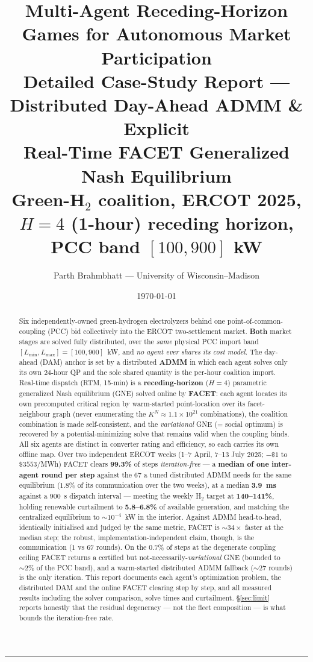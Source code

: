 \documentclass[11pt, letterpaper]{article}
\title{\textbf{Multi-Agent Receding-Horizon Games for Autonomous Market Participation}\\[4pt]
\large Detailed Case-Study Report --- Distributed Day-Ahead ADMM \& Explicit\\
Real-Time FACET Generalized Nash Equilibrium\\
\normalsize Green-H$_2$ coalition, ERCOT 2025, $H=4$ (1-hour) receding horizon, PCC band $[100,900]$ kW}
\author{Parth Brahmbhatt --- University of Wisconsin--Madison}
\date{\today}
\begin{document}
\maketitle
\tableofcontents
\bigskip\hrule\bigskip

\begin{abstract}
Six independently-owned green-hydrogen electrolyzers behind one point-of-common-coupling (PCC) bid
collectively into the ERCOT two-settlement market. \textbf{Both} market stages are solved fully
distributed, over the \emph{same} physical PCC import band $[L_{\min},L_{\max}]=[100,900]$~kW, and
\emph{no agent ever shares its cost model}. The day-ahead (DAM) anchor is set by a distributed
\textbf{ADMM} in which each agent solves only its own 24-hour QP and the sole shared quantity is
the per-hour coalition import. Real-time dispatch (RTM, 15-min) is a \textbf{receding-horizon}
($H=4$) parametric generalized Nash equilibrium (GNE) solved online by \textbf{FACET}: each agent
locates its own precomputed critical region by warm-started point-location over its facet-neighbour
graph (never enumerating the $K^N\!\approx\!1.1\times10^{21}$ combinations), the coalition combination
is made self-consistent, and the \emph{variational} GNE (= social optimum) is recovered by a
potential-minimizing solve that remains valid when the coupling binds. All six agents are distinct
in converter rating and efficiency, so each carries its own offline map. Over two independent ERCOT
weeks (1--7 April, 7--13 July 2025; $-\$1$ to $\$3553$/MWh) FACET clears \textbf{99.3\%} of steps
\emph{iteration-free} --- a \textbf{median of one inter-agent round per step} against the $67$ a
tuned distributed ADMM needs for the same equilibrium ($1.8\%$ of its communication over the two
weeks), at a median \textbf{3.9~ms} against a $900$~s dispatch interval --- meeting the weekly
H$_2$ target at \textbf{140--141\%}, holding renewable curtailment to \textbf{5.8--6.8\%} of
available generation, and matching the centralized equilibrium to $\sim\!10^{-4}$~kW in the
interior. Against ADMM head-to-head, identically initialised and judged by the same metric, FACET
is $\sim\!34\times$ faster at the median step; the robust, implementation-independent claim, though,
is the communication ($1$ vs $67$ rounds). On the $0.7\%$ of steps at the degenerate coupling
ceiling FACET returns a certified but not-necessarily-\emph{variational} GNE (bounded to
$\sim\!2\%$ of the PCC band), and a warm-started distributed ADMM fallback ($\sim\!27$ rounds) is
the only iteration. This report documents each agent's optimization problem, the distributed DAM
and the online FACET clearing step by step, and all measured results including the solver
comparison, solve times and curtailment. \S\ref{sec:limit} reports honestly that the residual
degeneracy --- not the fleet composition --- is what bounds the iteration-free rate.
\end{abstract}
\end{document}
